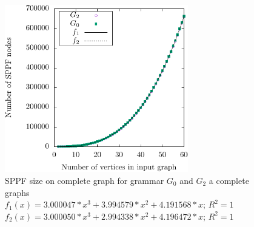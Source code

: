\begin{figure}[ht]
\centering




 \includegraphics[width=8cm]{dot/grph2.pdf}
\caption{SPPF size on complete graph for grammar $G_0$ and $G_2$ a complete graphs \\
$f_1(x) = 3.000047*x^3 + 3.994579*x^2 + 4.191568*x$; $R^2 = 1$\\
$f_2(x) = 3.000050*x^3 + 2.994338*x^2 + 4.196472*x$; $R^2 = 1$}
\label{pic:SPPFSize}
\end{figure}


%




